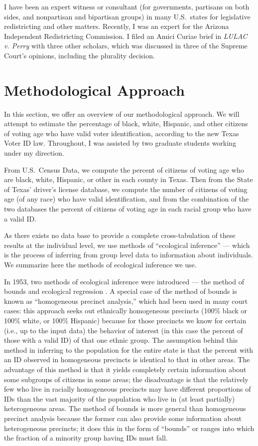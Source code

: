 \documentclass[12pt]{article}
\begin{document}
I have been an expert witness or consultant (for governments,
partisans on both sides, and nonpartisan and bipartisan groups) in
many U.S.\ states for legislative redistricting and other matters.
Recently, I was an expert for the Arizona Independent Redistricting
Commission.  I filed an Amici Curiae brief in \emph{LULAC v. Perry}
with three other scholars, which was discussed in three of the Supreme
Court's opinions, including the plurality decision.

\section{Methodological Approach}\label{s:methods}

In this section, we offer an overview of our methodological approach.
We will attempt to estimate the percentage of black, white, Hispanic,
and other citizens of voting age who have valid voter identification,
according to the new Texas Voter ID law.  Throughout, I was assisted
by two graduate students working under my direction.

From U.S.\ Census Data, we compute the percent of citizens of voting
age who are black, white, Hispanic, or other in each county in
Texas.  Then from the State of Texas' driver's license database, we
compute the number of citizens of voting age (of any race) who have
valid identification, and from the combination of the two databases
the percent of citizens of voting age in each racial group who have a valid ID.  

As there exists no data base to provide a complete cross-tabulation of
these results at the individual level, we use methods of ``ecological
inference'' --- which is the process of inferring from group level
data to information about individuals.  We summarize here the methods
of ecological inference we use.

In 1953, two methods of ecological inference were introduced --- the
method of bounds \citep{DunDav53} and ecological regression
\citep{Goodman53}. A special case of the method of bounds is known as
``homogeneous precinct analysis,'' which had been used in many court
cases: this approach seeks out ethnically homogeneous precincts (100\%
black or 100\% white, or 100\% Hispanic) because for those precincts
we know for certain (i.e., up to the input data) the behavior of
interest (in this case the percent of those with a valid ID) of that
one ethnic group.  The assumption behind this method in inferring to
the population for the entire state is that the percent with an ID
observed in homogeneous precincts is identical to that in other areas.
The advantage of this method is that it yields completely certain
information about some subgroups of citizens in some areas; the
disadvantage is that the relatively few who live in racially
homogeneous precincts may have different proportions of IDs
than the vast majority of the population who live in (at least
partially) heterogeneous areas.  The method of bounds is more general
than homogeneous precinct analysis because the former can also provide
some information about heterogeneous precincts; it does this in the
form of ``bounds'' or ranges into which the fraction of a minority
group having IDs must fall.
\end{document}
